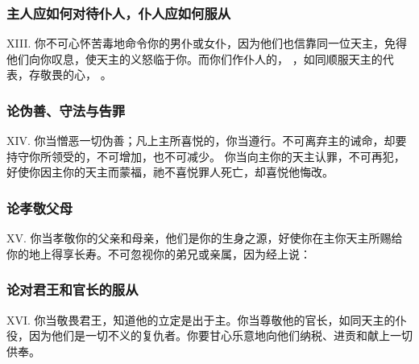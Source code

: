 
\subsubsection{主人应如何对待仆人，仆人应如何服从}

XIII. 你不可心怀苦毒地命令你的男仆或女仆，因为他们也信靠同一位天主，免得他们向你叹息，使天主的义怒临于你。而你们作仆人的， ，如同顺服天主的代表，存敬畏的心， 。\par


\subsubsection{论伪善、守法与告罪}

XIV. 你当憎恶一切伪善；凡上主所喜悦的，你当遵行。不可离弃主的诫命，却要持守你所领受的，不可增加，也不可减少。  你当向主你的天主认罪，不可再犯，好使你因主你的天主而蒙福，祂不喜悦罪人死亡，却喜悦他悔改。\par


\subsubsection{论孝敬父母}

XV. 你当孝敬你的父亲和母亲，他们是你的生身之源，好使你在主你天主所赐给你的地上得享长寿。不可忽视你的弟兄或亲属，因为经上说： \par


\subsubsection{论对君王和官长的服从}

XVI. 你当敬畏君王，知道他的立定是出于主。你当尊敬他的官长，如同天主的仆役，因为他们是一切不义的复仇者。你要甘心乐意地向他们纳税、进贡和献上一切供奉。\par

